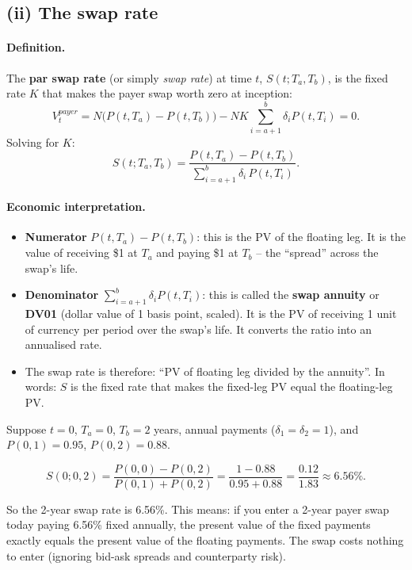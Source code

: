 \documentclass[11pt]{article}
\begin{document}
\subsection{(ii) The swap rate}

\paragraph{Definition.}  The \textbf{par swap rate} (or simply \emph{swap rate}) at time $t$,
$S(t;T_a,T_b)$, is the fixed rate $K$ that makes the payer swap worth
zero at inception:
\[
V_t^{payer} = N\big(P(t,T_a)-P(t,T_b)\big) - NK\sum_{i=a+1}^b \delta_i P(t,T_i) = 0.
\]
Solving for $K$:
\[
\boxed{
S(t;T_a,T_b)
= \frac{P(t,T_a) - P(t,T_b)}{\sum_{i=a+1}^{b}\delta_i\,P(t,T_i)}.
}
\]

\paragraph{Economic interpretation.}

\begin{itemize}
  \item \textbf{Numerator} $P(t,T_a)-P(t,T_b)$: this is the PV of the
  floating leg.  It is the value of receiving \$1 at $T_a$ and paying \$1
  at $T_b$ -- the ``spread'' across the swap's life.

  \item \textbf{Denominator} $\sum_{i=a+1}^b\delta_i P(t,T_i)$: this is
  called the \textbf{swap annuity} or \textbf{DV01} (dollar value of 1
  basis point, scaled).  It is the PV of receiving 1 unit of currency per
  period over the swap's life.  It converts the ratio into an annualised
  rate.

  \item The swap rate is therefore: ``PV of floating leg divided by the
  annuity''.  In words: $S$ is the fixed rate that makes the fixed-leg PV
  equal the floating-leg PV.
\end{itemize}

\begin{example_box}
Suppose $t=0$, $T_a=0$, $T_b = 2$ years, annual payments ($\delta_1=\delta_2=1$),
and $P(0,1)=0.95$, $P(0,2)=0.88$.

\[
S(0;0,2) = \frac{P(0,0)-P(0,2)}{P(0,1)+P(0,2)}
= \frac{1-0.88}{0.95+0.88}
= \frac{0.12}{1.83} \approx 6.56\%.
\]

So the 2-year swap rate is 6.56\%.  This means: if you enter a 2-year
payer swap today paying 6.56\% fixed annually, the present value of the
fixed payments exactly equals the present value of the floating payments.
The swap costs nothing to enter (ignoring bid-ask spreads and counterparty
risk).
\end{example_box}
\end{document}
